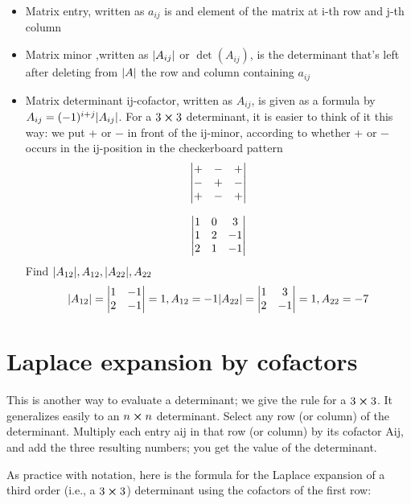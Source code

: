 \documentclass{article}
\begin{document}
    \begin{itemize}
        \item Matrix entry, written as $a_{ij}$ is and element of the matrix at i-th row and j-th column
        \item Matrix minor ,written as $\abs{A_{ij}}$ or $\det(A_{ij})$, is the determinant that's left after deleting from $\abs{A}$ the row and column containing $a_{ij}$
        \item Matrix determinant ij-cofactor, written as $A_{ij}$, is given as a formula by $A_{ij} = (-1)^{i+j}\abs{A_{ij}}$. For a $3 \cross 3$ determinant, it is easier to think of it this way: we put + or − in front of the ij-minor, according to whether + or − occurs in the ij-position in the checkerboard pattern
        \[
            \mdet{
            + & - & +\\
            - & + & -\\
            + & - & +
            }
        \]
        \begin{example}
            \[
                \mdet{
                1 & 0 & 3\\
                1 & 2 & -1\\
                2 & 1 & -1
                }
            \]
            Find $\abs{A_{12}}, A_{12}, \abs{A_{22}}, A_{22}$
            \[
                \abs{A_{12}} = \mdet{1 & -1\\ 2 & -1} =1, A_{12} = -1\\
                \abs{A_{22}} = \mdet{1 & 3\\ 2 & -1} =1, A_{22} = -7\\

            \]
        \end{example}
    \end{itemize}

    \section{Laplace expansion by cofactors}

    This is another way to evaluate a determinant; we give the rule for a $3 \cross 3$. It generalizes easily to an $n \cross n$ determinant.
    Select any row (or column) of the determinant. Multiply each entry aij in that row (or column) by its cofactor Aij, and add the three resulting numbers; you get the value of the determinant.

    As practice with notation, here is the formula for the Laplace expansion of a third order (i.e., a $3 \cross 3$) determinant using the cofactors of the first row:
\end{document}

